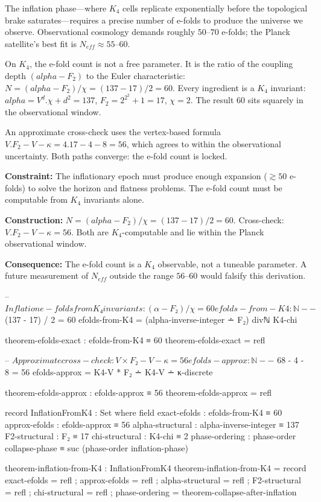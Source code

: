 \documentclass[11pt,a4paper]{book}
\def\alpha{alpha}%
\def\cdot{.}%
\def\mathrm#1{#1}%
\begin{document}
The inflation phase---where $K_4$ cells replicate exponentially before
the topological brake saturates---requires a precise number of e-folds
to produce the universe we observe.  Observational cosmology demands
roughly $50$--$70$ e-folds; the Planck satellite's best fit is
$N_{\mathrm{eff}} \approx 55$--$60$.

On $K_4$, the e-fold count is not a free parameter.  It is the ratio
of the coupling depth $(\alpha - F_2)$ to the Euler characteristic:
$N = (\alpha - F_2) / \chi = (137 - 17) / 2 = 60$.  Every ingredient
is a $K_4$ invariant: $\alpha = V^d \cdot \chi + d^2 = 137$,
$F_2 = 2^{2^2} + 1 = 17$, $\chi = 2$.  The result $60$ sits
squarely in the observational window.

An approximate cross-check uses the vertex-based formula
$V \cdot F_2 - V - \kappa = 4 \cdot 17 - 4 - 8 = 56$, which agrees
to within the observational uncertainty.  Both paths converge: the
e-fold count is locked.

\textbf{Constraint:}
The inflationary epoch must produce enough expansion ($\gtrsim 50$ e-folds)
to solve the horizon and flatness problems.  The e-fold count must be
computable from $K_4$ invariants alone.

\textbf{Construction:}
$N = (\alpha - F_2) / \chi = (137 - 17) / 2 = 60$.  Cross-check:
$V \cdot F_2 - V - \kappa = 56$.  Both are $K_4$-computable and lie
within the Planck observational window.

\textbf{Consequence:}
The e-fold count is a $K_4$ observable, not a tuneable parameter.
A future measurement of $N_{\mathrm{eff}}$ outside the range $56$--$60$
would falsify this derivation.

\begin{code}
-- $ Inflation e-folds from K₄ invariants: (α − F₂) / χ = 60

efolds-from-K4 : ℕ
-- $ (137 - 17) / 2 = 60
efolds-from-K4 = (alpha-inverse-integer ∸ F₂) divℕ K4-chi

theorem-efolds-exact : efolds-from-K4 ≡ 60
theorem-efolds-exact = refl

-- $ Approximate cross-check: V × F₂ − V − κ = 56
efolds-approx : ℕ
-- $ 68 - 4 - 8 = 56
efolds-approx = K4-V * F₂ ∸ K4-V ∸ κ-discrete

theorem-efolds-approx : efolds-approx ≡ 56
theorem-efolds-approx = refl

record InflationFromK4 : Set where
  field
    exact-efolds        : efolds-from-K4 ≡ 60
    approx-efolds       : efolds-approx ≡ 56
    alpha-structural    : alpha-inverse-integer ≡ 137
    F2-structural       : F₂ ≡ 17
    chi-structural      : K4-chi ≡ 2
    phase-ordering      : phase-order collapse-phase ≡ suc (phase-order inflation-phase)

theorem-inflation-from-K4 : InflationFromK4
theorem-inflation-from-K4 = record
  { exact-efolds     = refl
  ; approx-efolds    = refl
  ; alpha-structural = refl
  ; F2-structural    = refl
  ; chi-structural   = refl
  ; phase-ordering   = theorem-collapse-after-inflation }
\end{code}
\end{document}
